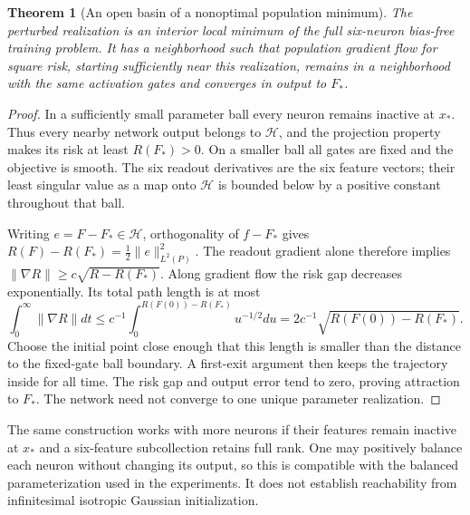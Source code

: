 \documentclass[11pt]{article}
\newtheorem{theorem}{Theorem}\newtheorem{lemma}[theorem]{Lemma}
\begin{document}
\begin{theorem}[An open basin of a nonoptimal population minimum]
The perturbed realization is an interior local minimum of the full
six-neuron bias-free training problem. It has a neighborhood such that
population gradient flow for square risk, starting sufficiently near
this realization, remains in a neighborhood with the same activation
gates and converges in output to $F_*$.
\end{theorem}
\begin{proof}
In a sufficiently small parameter ball every neuron remains inactive
at $x_*$. Thus every nearby network output belongs to $\mathcal H$,
and the projection property makes its risk at least $R(F_*)>0$.
On a smaller ball all gates are fixed and the objective is smooth.
The six readout derivatives are the six feature vectors; their least
singular value as a map onto $\mathcal H$ is bounded below by a
positive constant throughout that ball.

Writing $e=F-F_*\in\mathcal H$, orthogonality of $f-F_*$ gives
$R(F)-R(F_*)=\frac12\|e\|_{L^2(P)}^2$. The readout gradient alone
therefore implies
$\|\nabla R\|\ge c\sqrt{R-R(F_*)}$. Along gradient flow the risk
gap decreases exponentially. Its total path length is at most
\[
 \int_0^\infty\|\nabla R\|dt
 \le c^{-1}\int_0^{R(F(0))-R(F_*)}u^{-1/2}du
 =2c^{-1}\sqrt{R(F(0))-R(F_*)}.
\]
Choose the initial point close enough that this length is smaller than
the distance to the fixed-gate ball boundary. A first-exit argument
then keeps the trajectory inside for all time. The risk gap and output
error tend to zero, proving attraction to $F_*$. The network need not
converge to one unique parameter realization.
\end{proof}
The same construction works with more neurons if their features remain
inactive at $x_*$ and a six-feature subcollection retains full rank.
One may positively balance each neuron without changing its output,
so this is compatible with the balanced parameterization used in the
experiments. It does not establish reachability from infinitesimal
isotropic Gaussian initialization.
\end{document}
